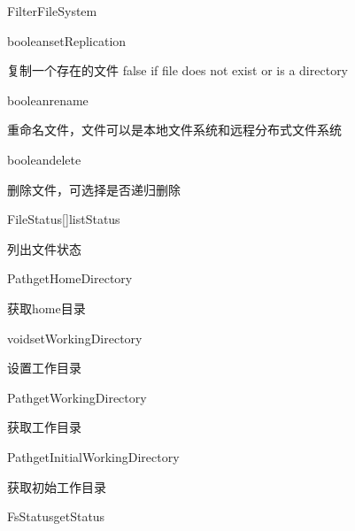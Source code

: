 \begin{XeClass}{FilterFileSystem}
    \begin{XeMethod}{\XePublic}{boolean}{setReplication}
         
 复制一个存在的文件
 false if file does not exist or is a directory

    \end{XeMethod}

    \begin{XeMethod}{\XePublic}{boolean}{rename}
         
 重命名文件，文件可以是本地文件系统和远程分布式文件系统

    \end{XeMethod}

    \begin{XeMethod}{\XePublic}{boolean}{delete}
         
 删除文件，可选择是否递归删除

    \end{XeMethod}

    \begin{XeMethod}{\XePublic}{FileStatus[]}{listStatus}
         
 列出文件状态

    \end{XeMethod}

    \begin{XeMethod}{\XePublic}{Path}{getHomeDirectory}
         
 获取home目录

    \end{XeMethod}

    \begin{XeMethod}{\XePublic}{void}{setWorkingDirectory}
         
 设置工作目录

    \end{XeMethod}

    \begin{XeMethod}{\XePublic}{Path}{getWorkingDirectory}
         
 获取工作目录

    \end{XeMethod}

    \begin{XeMethod}{\XeProtected}{Path}{getInitialWorkingDirectory}
         
 获取初始工作目录

    \end{XeMethod}

    \begin{XeMethod}{\XePublic}{FsStatus}{getStatus}
         

\end{XeMethod}
\end{XeClass}
